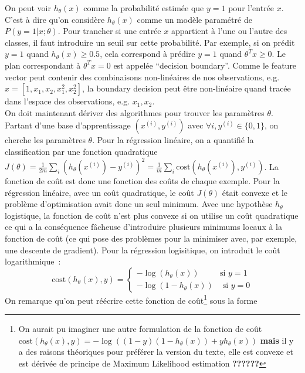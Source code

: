 \documentclass[10pt,a4paper]{article}
\begin{document}
On peut voir $h_\theta(x)$ comme la probabilité estimée que $y=1$ pour
l'entrée $x$. C'est à dire qu'on considère $h_\theta(x)$ comme un
modèle paramétré de $P(y=1 | x ; \theta)$. Pour trancher si une
entrée $x$ appartient à l'une ou l'autre des classes, il faut
introduire un seuil sur cette probabilité. Par exemple, si on prédit
$y=1$ quand $h_\theta(x) \geq 0.5$, cela correspond à prédire $y=1$
quand $\theta^T x \geq 0$. Le plan correspondant à $\theta^T x = 0$
est appelée ``decision boundary''. Comme le feature vector peut
contenir des combinaisons non-linéaires de nos observations, e.g.  $x
= [1, x_1, x_2, x_1^2, x_2^2]$, la boundary decision peut être
non-linéaire quand tracée dans l'espace des observations, e.g. $x_1,
x_2$.\\


On doit maintenant dériver des algorithmes pour trouver les paramètres
$\theta$. Partant d'une base d'apprentissage $(x^{(i)}, y^{(i)})$ avec
$\forall i, y^{(i)} \in \{0, 1\}$, on cherche les paramètres
$\theta$. Pour la régression linéaire, on a quantifié la
classification par une fonction quadratique $J(\theta) = \frac{1}{2m}
\sum_i (h_\theta(x^{(i)}) - y^{(i)})^2 =
\frac{1}{m}\sum_i \mbox{cost}(h_\theta(x^{(i)}), y^{(i)})$. La
fonction de coût est donc une fonction des coûts de chaque
exemple. Pour la régression linéaire, avec un coût quadratique, le
coût $J(\theta)$ était convexe et le problème d'optimisation avait
donc un seul minimum. Avec une hypothèse $h_\theta$ logistique, la
fonction de coût n'est plus convexe si on utilise un coût
quadratique ce qui a la conséquence fâcheuse d'introduire plusieurs
minimums locaux à la fonction de coût (ce qui pose des problèmes pour
la minimiser avec, par exemple, une descente de gradient). Pour la
régression logisitique, on introduit le coût logarithmique~:
\begin{equation}
\mbox{cost}(h_\theta(x), y) = \begin{cases} -\log(h_\theta(x)) & \mbox{
    si } y=1\\
-\log(1 - h_\theta(x)) & \mbox{ si } y=0
\end{cases}
\end{equation}
On remarque qu'on peut réécrire cette fonction de coût\footnote{On aurait pu imaginer une autre
  formulation de la fonction de coût $\mbox{cost}(h_\theta(x),y) = -\log((1-y)(1-h_\theta(x)) + y
h_\theta(x))$ \textbf{mais} il y a des raisons théoriques pour
préférer la version du texte, elle est convexe et est dérivée de
principe de Maximum Likelihood estimation \textbf{??????} } sous la forme
\end{document}
